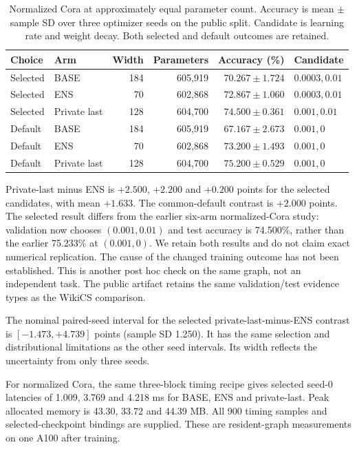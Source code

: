 \begin{table}[t]
\centering\small
\setlength{\tabcolsep}{4pt}
\caption{Normalized Cora at approximately equal parameter count. Accuracy is mean $\pm$ sample SD over three optimizer seeds on the public split. Candidate is learning rate and weight decay. Both selected and default outcomes are retained.}
\label{tab:cora-matched-budget}
\begin{tabular}{llrrrl}
\toprule
Choice & Arm & Width & Parameters & Accuracy (\%) & Candidate\\
\midrule
Selected & BASE & 184 & 605,919 & $70.267 \pm 1.724$ & $0.0003, 0.01$\\
Selected & ENS & 70 & 602,868 & $72.867 \pm 1.060$ & $0.0003, 0.01$\\
Selected & Private last & 128 & 604,700 & $74.500 \pm 0.361$ & $0.001, 0.01$\\
Default & BASE & 184 & 605,919 & $67.167 \pm 2.673$ & $0.001, 0$\\
Default & ENS & 70 & 602,868 & $73.200 \pm 1.493$ & $0.001, 0$\\
Default & Private last & 128 & 604,700 & $75.200 \pm 0.529$ & $0.001, 0$\\
\bottomrule
\end{tabular}
\end{table}

Private-last minus ENS is $+2.500$, $+2.200$ and $+0.200$ points for
the selected candidates, with mean $+1.633$. The common-default
contrast is $+2.000$ points. The selected result differs from the
earlier six-arm normalized-Cora study: validation now chooses
$(0.001,0.01)$ and test accuracy is 74.500\%, rather than the earlier
75.233\% at $(0.001,0)$. We retain both results and do not claim exact
numerical replication. The cause of the changed training outcome has
not been established. This is another post hoc check on the same graph,
not an independent task. The public artifact retains the same
validation/test evidence types as the WikiCS comparison.

The nominal paired-seed interval for the selected private-last-minus-ENS
contrast is $[-1.473,+4.739]$ points (sample SD 1.250).
It has the same selection and distributional limitations as the other
seed intervals. Its width reflects the uncertainty from only three seeds.

For normalized Cora, the same three-block timing recipe gives selected
seed-0 latencies of 1.009, 3.769 and 4.218 ms for BASE, ENS and
private-last. Peak allocated memory is 43.30, 33.72 and 44.39 MB.
All 900 timing samples and selected-checkpoint bindings are supplied.
These are resident-graph measurements on one A100 after training.
